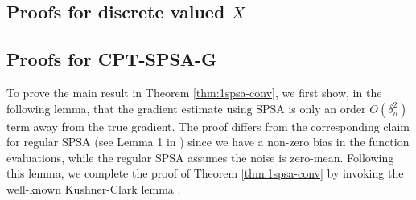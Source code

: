 \subsection{Proofs for discrete valued $X$}
\label{sec:proofs-discrete}


\subsection{Proofs for CPT-SPSA-G}
\label{appendix:1spsa}

To prove the main result in Theorem \ref{thm:1spsa-conv}, we first show, in the following lemma, that the gradient estimate using SPSA is only an order $O(\delta_n^2)$ term away from the true gradient. The proof differs from the corresponding claim for regular SPSA (see Lemma 1 in \cite{spall}) since we have a non-zero bias in the function evaluations, while the regular SPSA assumes the noise is zero-mean. Following this lemma, we complete the proof of Theorem \ref{thm:1spsa-conv} by invoking the well-known Kushner-Clark lemma \cite{kushner-clark}.

